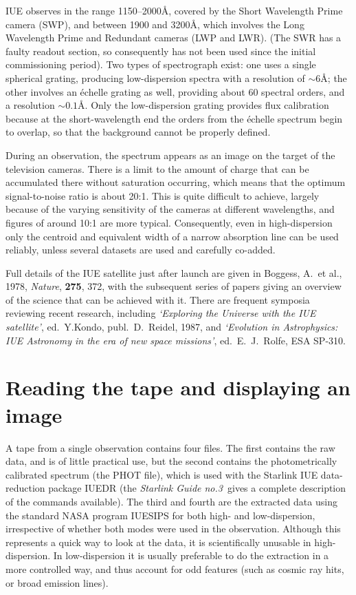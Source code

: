 \begin{latexonly}
IUE observes in the range 1150--2000{\AA}, covered by the Short Wavelength Prime
camera (SWP), and between 1900 and 3200{\AA}, which involves the Long
Wavelength Prime and Redundant cameras (LWP and LWR). (The SWR has a faulty
readout section, so consequently has not been used since the initial
commissioning period). Two types of spectrograph exist: one uses a single
spherical grating, producing low-dispersion spectra with a resolution of
$\sim6$\AA; the other involves an \'{e}chelle grating as well, providing about
60 spectral orders, and a resolution $\sim0.1${\AA}. Only the low-dispersion
grating provides flux calibration because at the short-wavelength
end the orders from the \'{e}chelle spectrum begin to overlap, so that the
background cannot be properly defined.
\end{latexonly}

During an observation, the spectrum appears as an image on the target of the
television cameras. There is a limit to the amount of charge that can be
accumulated there without saturation occurring, which means that the optimum
signal-to-noise ratio is about 20:1. This is quite difficult to
achieve, largely because of the varying sensitivity of the cameras at different
wavelengths, and figures of around 10:1 are more typical. Consequently, even
in high-dispersion only the centroid and equivalent width of a
narrow absorption line can be used reliably, unless several datasets are
used and carefully co-added.

Full details of the IUE satellite just after launch are given in
Boggess, A.~et al., 1978, {\it Nature}, {\bf 275}, 372, with the subsequent
series of papers giving an overview of the science that can be achieved with
it. There are frequent symposia reviewing recent research, including
{\em `Exploring the Universe with the IUE satellite'}, ed.\ Y.Kondo,
publ.\ D.~Reidel, 1987, and {\em `Evolution in Astrophysics: IUE Astronomy in
the era of new space missions'}, ed.\ E.~J.~Rolfe, ESA SP-310.

\section{Reading the tape and displaying an image}

A tape from a single observation contains four files. The first contains the
raw data, and is of little practical use, but the second contains the
photometrically calibrated spectrum (the PHOT file), which is used with the
Starlink IUE data-reduction package IUEDR (the {\it Starlink Guide no.3\,}
gives a complete description of the commands available). The third and fourth
are the extracted data using the standard NASA program IUESIPS for both
high- and low-dispersion, irrespective of whether both modes were used in the
observation. Although this represents a quick way to look at the data, it is
scientifically unusable in high-dispersion. In low-dispersion it is usually
preferable to do the extraction in a more controlled way, and thus account
for odd features (such as cosmic ray hits, or broad emission lines).

